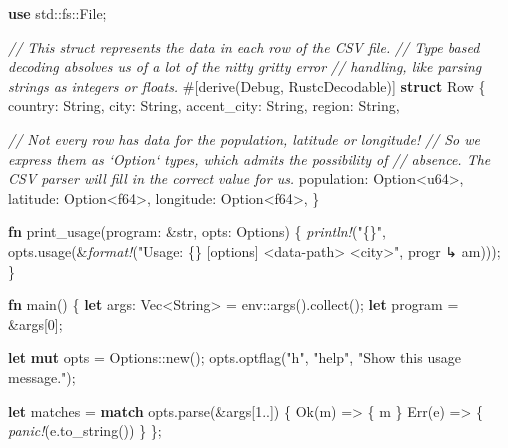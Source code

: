 \documentclass[a4paper,]{book}
\newenvironment{Shaded}{\begin{snugshade}}{\end{snugshade}}
\newcommand{\KeywordTok}[1]{\textcolor[rgb]{0.13,0.29,0.53}{\textbf{{#1}}}}
\newcommand{\DataTypeTok}[1]{\textcolor[rgb]{0.13,0.29,0.53}{{#1}}}
\newcommand{\DecValTok}[1]{\textcolor[rgb]{0.00,0.00,0.81}{{#1}}}
\newcommand{\ConstantTok}[1]{\textcolor[rgb]{0.00,0.00,0.00}{{#1}}}
\newcommand{\StringTok}[1]{\textcolor[rgb]{0.31,0.60,0.02}{{#1}}}
\newcommand{\CommentTok}[1]{\textcolor[rgb]{0.56,0.35,0.01}{\textit{{#1}}}}
\newcommand{\BuiltInTok}[1]{{#1}}
\newcommand{\PreprocessorTok}[1]{\textcolor[rgb]{0.56,0.35,0.01}{\textit{{#1}}}}
\newcommand{\AttributeTok}[1]{\textcolor[rgb]{0.77,0.63,0.00}{{#1}}}
\newcommand{\NormalTok}[1]{{#1}}
\begin{document}
\begin{Shaded}
\begin{Highlighting}[]
\KeywordTok{use} \NormalTok{std::fs::File;}

\CommentTok{// This struct represents the data in each row of the CSV file.}
\CommentTok{// Type based decoding absolves us of a lot of the nitty gritty error}
\CommentTok{// handling, like parsing strings as integers or floats.}
\AttributeTok{#[}\NormalTok{derive}\AttributeTok{(}\BuiltInTok{Debug}\AttributeTok{,} \NormalTok{RustcDecodable}\AttributeTok{)]}
\KeywordTok{struct} \NormalTok{Row \{}
    \NormalTok{country: }\DataTypeTok{String}\NormalTok{,}
    \NormalTok{city: }\DataTypeTok{String}\NormalTok{,}
    \NormalTok{accent_city: }\DataTypeTok{String}\NormalTok{,}
    \NormalTok{region: }\DataTypeTok{String}\NormalTok{,}

    \CommentTok{// Not every row has data for the population, latitude or longitude!}
    \CommentTok{// So we express them as `Option` types, which admits the possibility of}
    \CommentTok{// absence. The CSV parser will fill in the correct value for us.}
    \NormalTok{population: }\DataTypeTok{Option}\NormalTok{<}\DataTypeTok{u64}\NormalTok{>,}
    \NormalTok{latitude: }\DataTypeTok{Option}\NormalTok{<}\DataTypeTok{f64}\NormalTok{>,}
    \NormalTok{longitude: }\DataTypeTok{Option}\NormalTok{<}\DataTypeTok{f64}\NormalTok{>,}
\NormalTok{\}}

\KeywordTok{fn} \NormalTok{print_usage(program: &}\DataTypeTok{str}\NormalTok{, opts: Options) \{}
    \PreprocessorTok{println!}\NormalTok{(}\StringTok{"\{\}"}\NormalTok{, opts.usage(&}\PreprocessorTok{format!}\NormalTok{(}\StringTok{"Usage: \{\} [options] <data-path> <city>"}\NormalTok{, progr}
\NormalTok{↳ am)));}
\NormalTok{\}}

\KeywordTok{fn} \NormalTok{main() \{}
    \KeywordTok{let} \NormalTok{args: }\DataTypeTok{Vec}\NormalTok{<}\DataTypeTok{String}\NormalTok{> = env::args().collect();}
    \KeywordTok{let} \NormalTok{program = &args[}\DecValTok{0}\NormalTok{];}

    \KeywordTok{let} \KeywordTok{mut} \NormalTok{opts = Options::new();}
    \NormalTok{opts.optflag(}\StringTok{"h"}\NormalTok{, }\StringTok{"help"}\NormalTok{, }\StringTok{"Show this usage message."}\NormalTok{);}

    \KeywordTok{let} \NormalTok{matches = }\KeywordTok{match} \NormalTok{opts.parse(&args[}\DecValTok{1.}\NormalTok{.]) \{}
        \ConstantTok{Ok}\NormalTok{(m)  => \{ m \}}
        \ConstantTok{Err}\NormalTok{(e) => \{ }\PreprocessorTok{panic!}\NormalTok{(e.to_string()) \}}
    \NormalTok{\};}


\end{Highlighting}
\end{Shaded}
\end{document}

